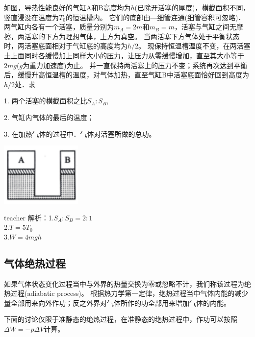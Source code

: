 \begin{example}
	如图，导热性能良好的气缸A和B高度均为$h$(已除开活塞的厚度)，横截面积不同，竖直浸没在温度为$T_0$的恒温槽内。
	它们的底部由—细管连通(细管容积可忽略)．两气缸内各有一个活塞，质量分别为$m_A=2m$和$m_B=m$，活塞与气缸之间无摩擦，两活塞的下方为理想气体，上方为真空。
	当两活塞下方气体处于平衡状态时，两活塞底面相对于气缸底的高度均为$h/2$。
	现保持恒温槽温度不变，在两活塞土上面同时各缓慢加上同样大小的压力，让压力从零缓慢增加，直至其大小等于$2mg$($g$为重力加速度)为止。
	并一直保持两活塞上的压力不变；系统再次达到平衡后，缓慢升高恒温槽的温度，对气体加热，直至气缸B中活塞底面恰好回到高度为$h/2$处．求
	
	1. 两个活塞的横截面积之比$S_A:S_B$,
	
	2. 气缸内气体的最后的温度；
	
	3. 在加热气体的过程中．气体对活塞所做的总功。
	
			\begin{flushright}
				\includegraphics[width = 0.3\textwidth]{images/thermal-22.pdf} 
			\end{flushright}
	 
	\begin{taggedblock}{teacher}
		\noindent
		解析：1.$S_A:S_B=2:1$
		\\2.$T=5T_0$
		\\3.$W=4mgh$
	\end{taggedblock}
\end{example}%


\subsection{气体绝热过程}
如果气体状态变化过程当中与外界的热量交换为零或忽略不计，我们称该过程为{\heiti 绝热过程}(adiabatic process)。
根据热力学第一定律，绝热过程当中气体内能的减少量全部用来向外作功；反之外界对气体所作的功全部用来增加气体的内能。

下面的讨论仅限于准静态的绝热过程，在准静态的绝热过程中，作功可以按照$\Delta W = -p \Delta V$计算。

